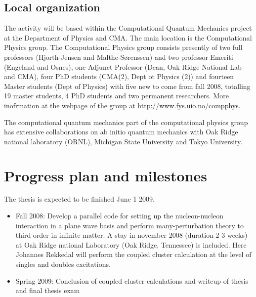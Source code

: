 \subsection*{Local organization}

The activity will be based within the 
Computational Quantum Mechanics project at the Department of Physics and 
CMA. The main location is the Computational Physics group. 
The Computational Physics  group consists  
presently of two full professors (Hjorth-Jensen and Malthe-S\o renssen) and two professor Emeriti (Engeland and Osnes), 
one Adjunct Professor (Dean, Oak Ridge National Lab and CMA), four PhD
students (CMA(2), Dept ot Physics (2)) and fourteen Master students (Dept of Physics) with five new to come from fall 2008, totalling
19 master students, 4 PhD students and two permanent researchers.
More inofrmation at the webpage of the group at http://www.fys.uio.no/compphys.

The computational quantum mechanics part of the computational physics group
has extensive collaborations on ab initio quantum mechanics with Oak Ridge national laboratory (ORNL), Michigan State University
and Tokyo University.
\section*{Progress plan and milestones}
The thesis is expected to be finished June 1 2009.
\begin{itemize}
\item Fall 2008: Develop a parallel code for setting up the nucleon-nucleon
interaction in  a plane wave basis and perform many-perturbation theory to third
order in infinite matter.
A stay in november 2008 (duration 2-3 weeks) at Oak Ridge national Laboratory (Oak Ridge, Tennessee) is included.
Here Johannes Rekkedal will perform the coupled cluster calculation at the level of singles and doubles excitations.
\item Spring 2009:  
Conclusion of coupled cluster calculations and 
writeup of thesis and final thesis exam
\end{itemize}


